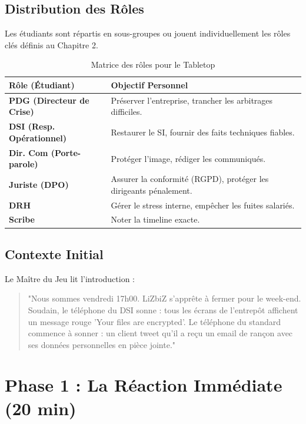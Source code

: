 \subsection{Distribution des Rôles}

Les étudiants sont répartis en sous-groupes ou jouent individuellement les rôles clés définis au Chapitre 2.

\begin{table}[htbp]
\centering
\begin{tabular}{p{4cm}p{8cm}}
    \toprule
    \textbf{Rôle (Étudiant)} & \textbf{Objectif Personnel} \\
    \midrule
    \textbf{PDG (Directeur de Crise)} & Préserver l'entreprise, trancher les arbitrages difficiles. \\
    \textbf{DSI (Resp. Opérationnel)} & Restaurer le SI, fournir des faits techniques fiables. \\
    \textbf{Dir. Com (Porte-parole)} & Protéger l'image, rédiger les communiqués. \\
    \textbf{Juriste (DPO)} & Assurer la conformité (RGPD), protéger les dirigeants pénalement. \\
    \textbf{DRH} & Gérer le stress interne, empêcher les fuites salariés. \\
    \textbf{Scribe} & Noter la timeline exacte. \\
    \bottomrule
\end{tabular}
\caption{Matrice des rôles pour le Tabletop}
\end{table}

\subsection{Contexte Initial}

Le Maître du Jeu lit l'introduction :
\begin{quote}
"Nous sommes vendredi 17h00. LiZbiZ s'apprête à fermer pour le week-end. Soudain, le téléphone du DSI sonne : tous les écrans de l'entrepôt affichent un message rouge 'Your files are encrypted'. Le téléphone du standard commence à sonner : un client tweet qu'il a reçu un email de rançon avec ses données personnelles en pièce jointe."
\end{quote}

\section{Phase 1 : La Réaction Immédiate (20 min)}

